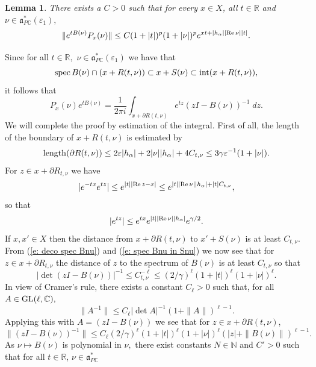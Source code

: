 \documentclass[12pt,a4paper]{article}
\newtheorem{Lemma}[Thm]{Lemma}
\newenvironment{lemma}[0]{\begin{Lemma}\noindent}%
{\end{Lemma}}
\def\proof{\par\noindent{\it Proof.}{\ }{\ }}
\def\msy#1{{\mathbb #1}}
\def\C{{\msy C}}
\def\N{{\msy N}}
\def\R{{\msy R}}
\def\ga{\alpha}
\def\ge{\varepsilon}
\def\gg{\gamma}
\def\got#1{\mathfrak #1}
\def\fa{{\got a}}
\def\Re{{\rm Re}\,}
\def\iC{{\scriptscriptstyle \C}}
\numberwithin{Thm}{section}
\numberwithin{equation}{section}
\def\faPdc{{\fa_{P\iC}^*}}
\numberwithin{equation}{section}
\def\spec{{\rm spec}}
\def\faPdc{\fa_{P\iC}^*}
\def\spec{{\rm spec}}
\def\xx{x}
\begin{document}
\begin{lemma}
There exists a $C > 0$ such that for every $\xx \in X$, all $t \in \R$ and $\nu \in \faPdc(\ge_1),$ 
\begin{equation}
\label{e: estimate projection}
\| e^{t B(\nu)} P_\xx(\nu) \| \leq C (1 + |t|)^p (1 + |\nu|)^p e^{\xx t  + |h_\ga||\Re \nu | |t|}.
\end{equation}
\end{lemma}


\proof  
Since for all $t \in \R,$ $ \nu \in \faPdc(\ge_1)$ we have that 
\begin{equation}
\label{e: spec Bnu in Snu}
\spec \,B(\nu) \cap (\xx + R(t,\nu)) \subset \xx + S(\nu) \subset {\rm int} (x + R(t,\nu)),
\end{equation}
it follows that 
$$ 
P_\xx (\nu)e^{tB(\nu)}= \frac1{2\pi i} \int_{\xx + \partial R(t,\nu)} e^{tz} (zI - B(\nu))^{-1}\; dz.
$$ 
We will complete the proof by estimation of the integral. First of all, the length of
the boundary of $\xx + R(t, \nu )$ is estimated by
\begin{equation}
\label{e: length partial R}
{\rm length}(\partial R(t, \nu)) \leq 2 \ge |h_\ga| + 2|\nu||h_\ga| + 4 C_{t,\nu} \leq 
3\gg\ge^{-1}(1 + |\nu|).
\end{equation}
For $z \in \xx + \partial R_{t,\nu}$ we have  
$$ 
|e^{-t\xx} e^{tz}| \leq e^{|t||\Re z -\xx|}  \leq e^{|t| |\Re \nu| |h_\ga| + |t| C_{t,\nu}},
$$ 
so that
\begin{equation}
\label{e: estimate power e t z}
|e^{tz}|\leq e^{t\xx} e^{|t| |\Re \nu| |h_\ga|}e^{\gg/2}.
\end{equation}
If $\xx, \xx' \in X$ then the distance from $\xx +\partial R(t,\nu)$ to $\xx' + S(\nu)$ 
is at least $C_{t,\nu}.$ 
From (\ref{e: deco spec Bnu}) and (\ref{e: spec Bnu in Snu}) we now see that for $z \in \xx + \partial R_{t,\nu}$ the distance of $z$ to the spectrum of $B(\nu)$ is at least $C_{t,\nu}$ so that
$$ 
|\det (zI - B(\nu))|^{-1} \leq C_{t,\nu}^{- \ell} \leq (2/\gg)^\ell (1 + |t|)^\ell ( 1+ |\nu|)^\ell.
$$ 
In view of Cramer's rule, there exists a constant $C_\ell > 0$ such that,
for all $A \in {\rm GL}(\ell, \C),$
$$ 
\|A^{-1}\| \leq C_\ell |\det A|^{-1}( 1+ \|A\|)^{\ell -1}.
$$ 
Applying this with $A = (z I - B(\nu))$ we see that for $z \in \xx + \partial R(t,\nu)$,
 $$ 
\|(zI - B(\nu))^{-1}\| \leq C_\ell (2/\gg)^\ell (1 + |t|)^\ell ( 1+ |\nu|)^\ell (|z| + \|B(\nu)\|)^{\ell -1}.
$$
As $\nu \mapsto B(\nu)$ is polynomial in $\nu,$ there exist
constants $N \in \N$ and $C' >0$ such that for all $t\in \R$, $\nu\in \faPdc$
\end{document}

